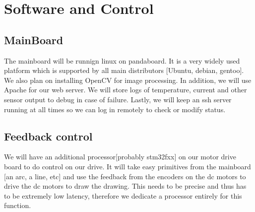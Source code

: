 \documentclass{article}
\begin{document}
\section{Software and Control}
\subsection{MainBoard}
The mainboard will be runnign linux on pandaboard. It is a very widely used platform which is supported by all main distributors [Ubuntu, debian, gentoo]. We also plan on installing OpenCV for image processing. In addition, we will use Apache for our web server. We will store logs of temperature, current and other sensor output to debug in case of failure. Lastly, we will keep an ssh server running at all times so we can log in remotely to check or modify status.
\subsection{Feedback control}
We will have an additional processor[probably stm32fxx] on our motor drive board to do control on our drive. It will take easy primitives from the mainboard [an arc, a line, etc] and use the feedback from the encoders on the dc motors to drive the dc motors to draw the drawing. This needs to be precise and thus has to be extremely low latency, therefore we dedicate a processor entirely for this function. 
\end{document}

